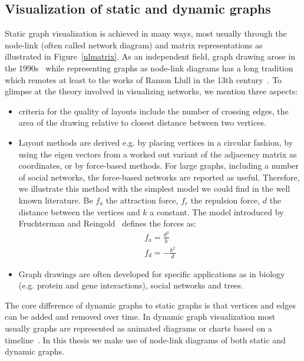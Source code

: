 \subsection{Visualization of static and dynamic graphs}
Static graph visualization is achieved in many ways,
most usually through the node-link (often called network diagram)
and matrix representations as illustrated in Figure~\ref{nlmatrix}.
As an independent field, graph drawing arose in the 1990s~\cite{dynGraph} while
representing graphs as node-link diagrams has a long tradition which remotes
at least to the works of Ramon Llull in the 13th century~\cite{llull}.
To glimpse at the theory involved in visualizing networks, we mention three aspects:
\begin{itemize}
	\item criteria for the quality of layouts include the number of crossing edges, the area of the drawing relative to closest distance between two vertices.
	\item Layout methods are derived e.g. by placing vertices in a circular fashion, by using the eigen vectors from a worked out variant of the adjacency matrix as coordinates, or by force-based methods. For large graphs, including a number of social networks, the force-based networks are reported as useful. Therefore, we illustrate this method with the simplest model we could find in the well known literature. Be $f_a$ the attraction force, $f_r$ the repulsion force, $d$ the distance between the vertices and $k$ a constant. The model introduced by Fruchterman and Reingold~\cite{fr} defines the forces as:
\begin{align}
	f_a = \frac{d^2}{k}\\
	f_d = -\frac{k^2}{d}
\end{align}
	\item Graph drawings are often developed for specific applications as in biology (e.g. protein and gene interactions), social networks and trees.
\end{itemize}

The core difference of dynamic graphs to static graphs is that vertices and edges
can be added and removed over time.
In dynamic graph visualization most usually graphs are represented as animated diagrams
or charts based on a timeline~\cite{dynGraph}.
In this thesis we make use of node-link diagrams of both static and dynamic graphs.

